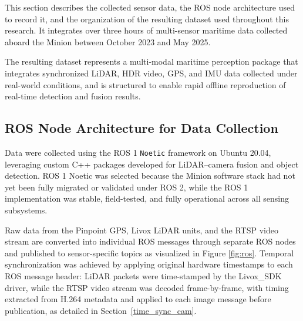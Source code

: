 \documentclass[../main.tex]{subfiles}
\begin{document}


This section describes the collected sensor data, the ROS node architecture used to record it, 
and the organization of the resulting dataset used throughout this research.  
It integrates over three hours of multi-sensor maritime data collected aboard the Minion between October 2023 and May 2025.

The resulting dataset represents a multi-modal maritime perception package that integrates synchronized LiDAR, HDR video, GPS, and IMU data collected under real-world conditions, and is structured to enable rapid offline reproduction of real-time detection and fusion results.


\subsection{ROS Node Architecture for Data Collection}
\label{sec:ros_architecture}

Data were collected using the ROS 1 \texttt{Noetic} framework on Ubuntu 20.04, 
leveraging custom C++ packages developed for LiDAR–camera fusion and object detection.  
ROS 1 Noetic was selected because the Minion software stack had not yet been fully migrated or validated under ROS 2, while the ROS 1 implementation was stable, field-tested, and fully operational across all sensing subsystems.

Raw data from the Pinpoint GPS, Livox LiDAR units, and the RTSP video stream are converted into individual ROS messages through separate ROS nodes and published to sensor-specific topics as visualized in Figure \ref{fig:ros}.  
Temporal synchronization was achieved by applying original hardware timestamps to each ROS message header: LiDAR packets were time-stamped by the Livox\_SDK driver, while the RTSP video stream was decoded frame-by-frame, with timing extracted from H.264 metadata and applied to each image message before publication, as detailed in Section~\ref{time_sync_cam}.
\end{document}
